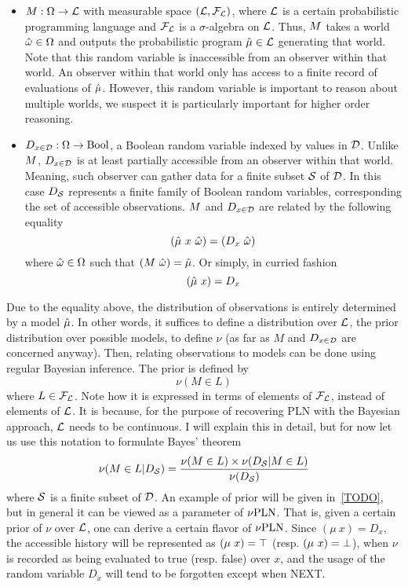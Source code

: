 \documentclass[]{article}
\begin{document}
\begin{itemize}
\item $M : \Omega \to \mathcal{L}$ with measurable space
  $(\mathcal{L}, \mathcal{F}_{\mathcal{L}})$, where $\mathcal{L}$ is a certain
  probabilistic programming language and $\mathcal{F}_{\mathcal{L}}$ is a
  $\sigma$-algebra on $\mathcal{L}$.  Thus, $M$ takes a world
  $\hat{\omega} \in \Omega$ and outputs the probabilistic program $\hat{\mu}
  \in \mathcal{L}$ generating that world.  Note that this random
  variable is inaccessible from an observer within that world.  An
  observer within that world only has access to a finite record of
  evaluations of $\hat{\mu}$.  However, this random variable is important
  to reason about multiple worlds, we suspect it is particularly
  important for higher order reasoning.
\item $D_{x\in\mathcal{D}} : \Omega \to \textup{Bool}$, a Boolean random variable indexed by
  values in $\mathcal{D}$.  Unlike $M$, $D_{x\in\mathcal{D}}$ is at least partially
  accessible from an observer within that world.  Meaning, such
  observer can gather data for a finite subset $\mathcal{S}$ of
  $\mathcal{D}$.  In this case $D_{\mathcal{S}}$ represents a finite family of
  Boolean random variables, corresponding the set of accessible
  observations.  $M$ and $D_{x\in\mathcal{D}}$ are related by the following
  equality
  $$(\anymu\ x\ \anyomega) = (D_x\ \anyomega)$$ where $\hat{\omega} \in
  \Omega$ such that $(M\ \hat{\omega}) = \hat{\mu}$.  Or simply, in curried
  fashion
  $$(\hat{\mu}\ x) = D_x$$
\end{itemize}
Due to the equality above, the distribution of observations is
entirely determined by a model $\hat{\mu}$.  In other words, it suffices
to define a distribution over $\mathcal{L}$, the prior distribution over
possible models, to define $\nu$ (as far as $M$ and $D_{x\in\mathcal{D}}$ are
concerned anyway).  Then, relating observations to models can be done
using regular Bayesian inference.  The prior is defined by
$$\nu(M \in L)$$ where $L \in \mathcal{F}_{\mathcal{L}}$.  Note how it is
expressed in terms of elements of $\mathcal{F}_{\mathcal{L}}$, instead of
elements of $\mathcal{L}$.  It is because, for the purpose of recovering
PLN with the Bayesian approach, $\mathcal{L}$ needs to be continuous.  I
will explain this in detail, but for now let us use this notation to
formulate Bayes' theorem
$$\nu(M \in L | D_{\mathcal{S}}) = \frac{\nu(M \in L) \times \nu(D_{\mathcal{S}} | M \in
  L)}{\nu(D_{\mathcal{S}})}$$ where $\mathcal{S}$ is a finite subset of
$\mathcal{D}$.  An example of prior will be given in~\ref{TODO}, but in
general it can be viewed as a parameter of $\nu\textup{PLN}$.  That is, given a
certain prior of $\nu$ over $\mathcal{L}$, one can derive a certain
flavor of $\nu\textup{PLN}$.  Since $(\mu\ x) = D_x$, the accessible history
will be represented as $(\mu\ x) = \top$ (resp. $(\mu\ x) = \bot$), when
$\nu$ is recorded as being evaluated to true (resp. false) over $x$,
and the usage of the random variable $D_x$ will tend to be forgotten
except when NEXT.
\end{document}
